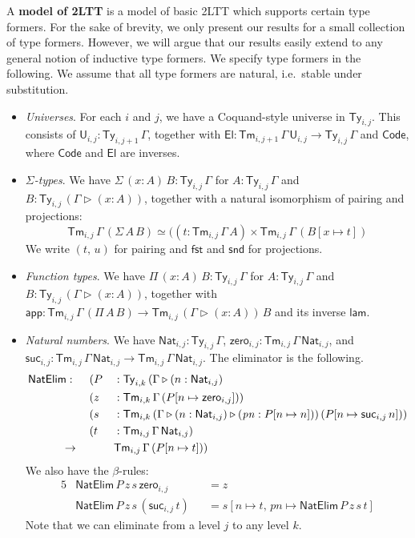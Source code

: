 \documentclass[acmsmall]{acmart}
\newcommand{\mit}[1]{\mathit{#1}}
\newcommand{\msf}[1]{\mathsf{#1}}
\newcommand{\ext}{\triangleright}
\newcommand{\Code}{\msf{Code}}
\newcommand{\El}{\msf{El}}
\newcommand{\lam}{\msf{lam}}
\newcommand{\app}{\msf{app}}
\newcommand{\NatElim}{\msf{NatElim}}
\renewcommand{\U}{\msf{U}}
\newcommand{\Ty}{\msf{Ty}}
\newcommand{\Tm}{\msf{Tm}}
\newcommand{\Nat}{\msf{Nat}}
\newcommand{\zero}{\msf{zero}}
\newcommand{\suc}{\msf{suc}}
\newcommand{\fst}{\msf{fst}}
\newcommand{\snd}{\msf{snd}}
\theoremstyle{remark}
\begin{document}
\begin{definition} A \textbf{model of 2LTT} is a model of basic 2LTT
which supports certain type formers. For the sake of brevity, we only present
our results for a small collection of type formers. However, we will argue that
our results easily extend to any general notion of inductive type formers. We
specify type formers in the following.  We assume that all type formers are
natural, i.e.\ stable under substitution.
\begin{itemize}
\item \emph{Universes}. For each $i$ and $j$, we have a Coquand-style universe
  \cite{TODO} in $\Ty_{i,j}$. This consists of $\U_{i,j} : \Ty_{i,j+1}\,\Gamma$,
  together with $\El : \Tm_{i,j+1}\,\Gamma\,\U_{i,j} \to \Ty_{i,j}\,\Gamma$ and $\Code$, where $\Code$
  and $\El$ are inverses.
\item \emph{$\Sigma$-types}. We have $\Sigma\,(x : A)\,B : \Ty_{i,j}\,\Gamma$ for $A : \Ty_{i,j}\,\Gamma$
  and $B : \Ty_{i,j}\,(\Gamma \ext (x : A))$, together with a natural isomorphism of pairing and projections:
  \[ \Tm_{i,j}\,\Gamma\,(\Sigma\,A\,B) \simeq ((t : \Tm_{i,j}\,\Gamma\,A) \times \Tm_{i,j}\,\Gamma\,(B[x\mapsto t]) \]
  We write $(t,\,u)$ for pairing and $\fst$ and $\snd$ for projections.
\item \emph{Function types}. We have $\Pi\,(x : A)\,B : \Ty_{i,j}\,\Gamma$ for $A :
  \Ty_{i,j}\,\Gamma$ and $B : \Ty_{i,j}\,(\Gamma \ext (x : A))$, together with
  $\app : \Tm_{i,j}\,\Gamma\,(\Pi\,A\,B) \to \Tm_{i,j}\,(\Gamma \ext (x :
  A))\,B$ and its inverse $\lam$.
\item \emph{Natural numbers}. We have $\Nat_{i,j} : \Ty_{i,j}\,\Gamma$, $\zero_{i,j} : \Tm_{i,j}\,\Gamma\,\Nat_{i,j}$,
  and $\suc_{i,j} : \Tm_{i,j}\,\Gamma\,\Nat_{i,j} \to \Tm_{i,j}\,\Gamma\,\Nat_{i,j}$. The eliminator is the following.
  \begin{alignat*}{5}
    & \NatElim :\hspace{0.5em}
                &&  (P &&: \Ty_{i,k}\,(\Gamma \ext (n : \Nat_{i,j}) \\
    &           &&  (z &&: \Tm_{i,k}\,\Gamma\,(P[n\mapsto \zero_{i,j}])) \\
    &           &&  (s &&: \Tm_{i,k}\,(\Gamma \ext (n : \Nat_{i,j}) \ext (\mit{pn} : P[n\mapsto n]))\,(P[n\mapsto \suc_{i,j}\,n]))\\
    &           &&  (t &&: \Tm_{i,j}\,\Gamma\,\Nat_{i,j}) \\
    &\hspace{3em}\to        &&&& \Tm_{i,j}\,\Gamma\,(P[n\mapsto t]))
  \end{alignat*}
  We also have the $\beta$-rules:
  \begin{alignat*}{5}
    & \NatElim\,P\,z\,s\,\zero_{i,j}     &&= z \\
    & \NatElim\,P\,z\,s\,(\suc_{i,j}\,t) &&= s[n \mapsto t,\,\mit{pn} \mapsto \NatElim\,P\,z\,s\,t]
  \end{alignat*}
  Note that we can eliminate from a level $j$ to any level $k$.
\end{itemize}
\end{definition}
\end{document}
